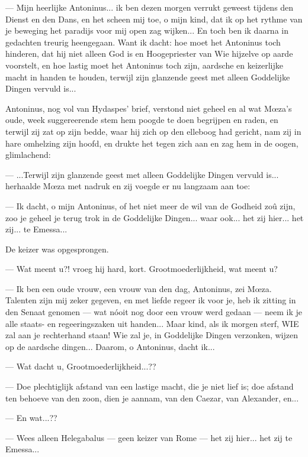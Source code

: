 \documentclass[a4paper, 12pt, oneside, dutch]{article}
\begin{document}
--- Mijn heerlijke Antoninus... ik ben dezen morgen verrukt geweest tijdens den Dienst en den Dans, en het scheen mij toe, o mijn kind, dat ik op het rythme van je beweging het paradijs voor mij open zag wijken... En toch ben ik daarna in gedachten treurig heengegaan. Want ik dacht: hoe moet het Antoninus toch hinderen, dat hij niet alleen God is en Hoogepriester van Wie hijzelve op aarde voorstelt, en hoe lastig moet het Antoninus toch zijn, aardsche en keizerlijke macht in handen te houden, terwijl zijn glanzende geest met alleen Goddelijke Dingen vervuld is...

Antoninus, nog vol van Hydaspes' brief, verstond niet geheel en al wat Mœza's oude, week suggereerende stem hem poogde te doen begrijpen en raden, en terwijl zij zat op zijn bedde, waar hij zich op den elleboog had gericht, nam zij in hare omhelzing zijn hoofd, en drukte het tegen zich aan en zag hem in de oogen, glimlachend:

--- ...Terwijl zijn glanzende geest met alleen Goddelijke Dingen vervuld is... herhaalde Mœza met nadruk en zij voegde er nu langzaam aan toe:

--- Ik dacht, o mijn Antoninus, of het niet meer de wil van de Godheid zoû zijn, zoo je geheel je terug trok in de Goddelijke Dingen... waar ook... het zij hier... het zij... te Emessa...

De keizer was opgesprongen.

--- Wat meent u?! vroeg hij hard, kort. Grootmoederlijkheid, wat meent u?

--- Ik ben een oude vrouw, een vrouw van den dag, Antoninus, zei Mœza. Talenten zijn mij zeker gegeven, en met liefde regeer ik voor je, heb ik zitting in den Senaat genomen --- wat nóoit nog door een vrouw werd gedaan --- neem ik je alle staats- en regeeringszaken uit handen... Maar kind, als ik morgen sterf, WIE zal aan je rechterhand staan! Wie zal je, in Goddelijke Dingen verzonken, wijzen op de aardsche dingen... Daarom, o Antoninus, dacht ik...

--- Wat dacht u, Grootmoederlijkheid...??

--- Doe plechtiglijk afstand van een lastige macht, die je niet lief is; doe afstand ten behoeve van den zoon, dien je aannam, van den Caezar, van Alexander, en...

--- En wat...??

--- Wees alleen Helegabalus --- geen keizer van Rome --- het zij hier... het zij te Emessa...
\end{document}
